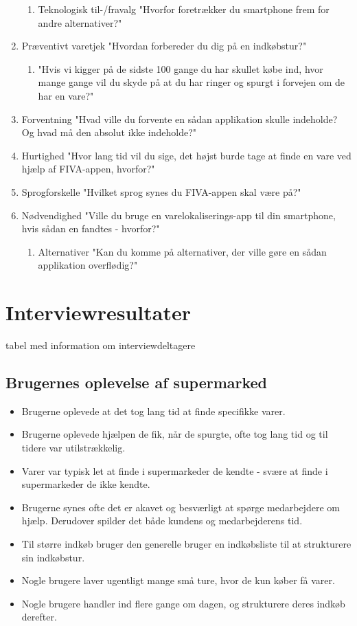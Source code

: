 \documentclass[12pt]{article}
\begin{document}
\begin{enumerate}
\begin{enumerate}
\item Teknologisk til-/fravalg "Hvorfor foretrækker du smartphone frem for andre alternativer?"
\end{enumerate}

\item Præventivt varetjek "Hvordan forbereder du dig på en indkøbstur?"

\begin{enumerate}
\item "Hvis vi kigger på de sidste 100 gange du har skullet købe ind, hvor mange gange vil du skyde på at du har ringer og spurgt i forvejen om de har en vare?"
\end{enumerate}

\item Forventning "Hvad ville du forvente en sådan applikation skulle indeholde? Og hvad må den absolut ikke indeholde?"
\item Hurtighed	"Hvor lang tid vil du sige, det højst burde tage at finde en vare ved hjælp af FIVA-appen, hvorfor?"
\item Sprogforskelle "Hvilket sprog synes du FIVA-appen skal være på?"
\item Nødvendighed "Ville du bruge en varelokaliserings-app til din smartphone, hvis sådan en fandtes - hvorfor?"

\begin{enumerate}
\item Alternativer "Kan du komme på alternativer, der ville gøre en sådan applikation overflødig?"
\end{enumerate}

\end{enumerate}

\section{Interviewresultater}
tabel med information om interviewdeltagere
\subsection{Brugernes oplevelse af supermarked}
\begin{itemize}
\item Brugerne oplevede at det tog lang tid at finde specifikke varer.
\item Brugerne oplevede hjælpen de fik, når de spurgte, ofte tog lang tid og til tidere var utilstrækkelig.
\item Varer var typisk let at finde i supermarkeder de kendte - svære at finde i supermarkeder de ikke kendte.
\item Brugerne synes ofte det er akavet og besværligt at spørge medarbejdere om hjælp. Derudover spilder det både kundens og medarbejderens tid.
\item Til større indkøb bruger den generelle bruger en indkøbsliste til at strukturere sin indkøbstur.
\item Nogle brugere laver ugentligt mange små ture, hvor de kun køber få varer.
\item Nogle brugere handler ind flere gange om dagen, og strukturere deres indkøb derefter. 
\end{itemize}
\end{document}
